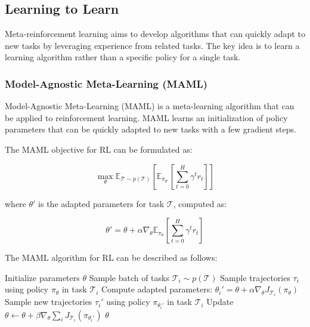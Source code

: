 \documentclass{article}
\begin{document}
\subsection{Learning to Learn}

Meta-reinforcement learning aims to develop algorithms that can quickly adapt to new tasks by leveraging experience from related tasks. The key idea is to learn a learning algorithm rather than a specific policy for a single task.

\subsubsection{Model-Agnostic Meta-Learning (MAML)}

Model-Agnostic Meta-Learning (MAML) is a meta-learning algorithm that can be applied to reinforcement learning. MAML learns an initialization of policy parameters that can be quickly adapted to new tasks with a few gradient steps.

The MAML objective for RL can be formulated as:

\begin{equation}
\max_{\theta} \mathbb{E}_{\mathcal{T} \sim p(\mathcal{T})} \left[ \mathbb{E}_{\pi_{\theta'}} \left[ \sum_{t=0}^{H} \gamma^t r_t \right] \right]
\end{equation}

where $\theta'$ is the adapted parameters for task $\mathcal{T}$, computed as:

\begin{equation}
\theta' = \theta + \alpha \nabla_{\theta} \mathbb{E}_{\pi_{\theta}} \left[ \sum_{t=0}^{H} \gamma^t r_t \right]
\end{equation}

The MAML algorithm for RL can be described as follows:

\begin{algorithm}
\begin{algorithmic}[1]
\STATE Initialize parameters $\theta$
    \STATE Sample batch of tasks $\mathcal{T}_i \sim p(\mathcal{T})$
        \STATE Sample trajectories $\tau_i$ using policy $\pi_\theta$ in task $\mathcal{T}_i$
        \STATE Compute adapted parameters: $\theta_i' = \theta + \alpha \nabla_{\theta} J_{\mathcal{T}_i}(\pi_\theta)$
        \STATE Sample new trajectories $\tau_i'$ using policy $\pi_{\theta_i'}$ in task $\mathcal{T}_i$
    \ENDFOR
    \STATE Update $\theta \leftarrow \theta + \beta \nabla_{\theta} \sum_i J_{\mathcal{T}_i}(\pi_{\theta_i'})$
\ENDWHILE
\RETURN $\theta$
\end{algorithmic}
\end{algorithm}
\end{document}
